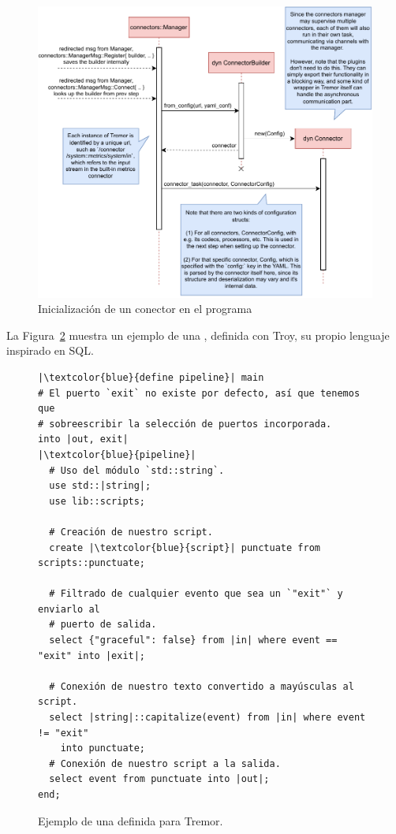 \begin{figure}
    \centering
    \includegraphics[width=\textwidth]{./Imagenes/initializing.pdf}
    \caption{Inicialización de un conector en el programa}%
    \label{fig:tremor_initializing}
\end{figure}

La Figura~\ref{fig:tremor_pipeline} muestra un ejemplo de una \pipeline,
definida con Troy, su propio lenguaje inspirado en SQL.

\begin{figure}
    \centering
    \begin{verbatim}
|\textcolor{blue}{define pipeline}| main
# El puerto `exit` no existe por defecto, así que tenemos que
# sobreescribir la selección de puertos incorporada.
into |out, exit|
|\textcolor{blue}{pipeline}|
  # Uso del módulo `std::string`.
  use std::|string|;
  use lib::scripts;

  # Creación de nuestro script.
  create |\textcolor{blue}{script}| punctuate from scripts::punctuate;

  # Filtrado de cualquier evento que sea un `"exit"` y enviarlo al
  # puerto de salida.
  select {"graceful": false} from |in| where event == "exit" into |exit|;

  # Conexión de nuestro texto convertido a mayúsculas al script.
  select |string|::capitalize(event) from |in| where event != "exit"
    into punctuate;
  # Conexión de nuestro script a la salida.
  select event from punctuate into |out|;
end;
    \end{verbatim}
    \caption{Ejemplo de una \pipeline definida para Tremor.}%
    \label{fig:tremor_pipeline}
\end{figure}


